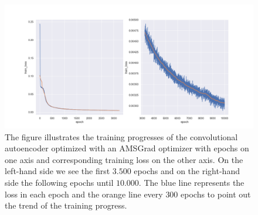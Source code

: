 \begin{figure}
\begin{center}
\includegraphics[width=\linewidth]{convolutional_AE_training_progress}
\end{center}
\caption{The figure illustrates the training progresses of the convolutional autoencoder optimized with an AMSGrad optimizer  with epochs on one axis and corresponding training loss on the other axis. On the left-hand side we see the first $3.500$ epochs and on the right-hand side the following epochs until $10.000$. The blue line represents the loss in each epoch and the orange line every $300$ epochs to point out the trend of the training progress.}\label{fig:convolutional_AE_training_progress}
\end{figure}
